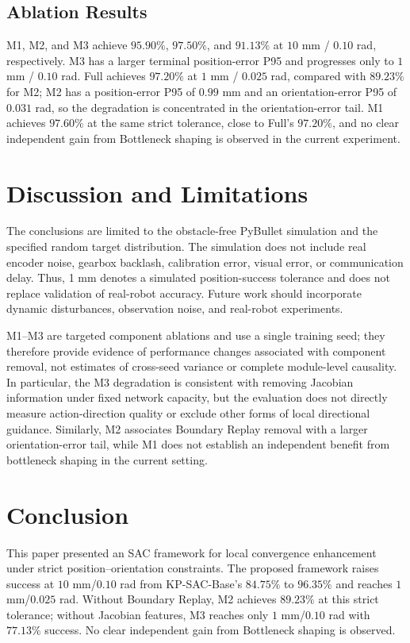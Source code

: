 \documentclass[conference]{IEEEtran}
\begin{document}
\subsection{Ablation Results}
M1, M2, and M3 achieve $95.90\%$, $97.50\%$, and $91.13\%$ at $10$ mm / $0.10$ rad, respectively. M3 has a larger terminal position-error P95 and progresses only to $1$ mm / $0.10$ rad. Full achieves $97.20\%$ at $1$ mm / $0.025$ rad, compared with $89.23\%$ for M2; M2 has a position-error P95 of $0.99$ mm and an orientation-error P95 of $0.031$ rad, so the degradation is concentrated in the orientation-error tail. M1 achieves $97.60\%$ at the same strict tolerance, close to Full's $97.20\%$, and no clear independent gain from Bottleneck shaping is observed in the current experiment.

\section{Discussion and Limitations}
The conclusions are limited to the obstacle-free PyBullet simulation and the specified random target distribution. The simulation does not include real encoder noise, gearbox backlash, calibration error, visual error, or communication delay. Thus, 1 mm denotes a simulated position-success tolerance and does not replace validation of real-robot accuracy. Future work should incorporate dynamic disturbances, observation noise, and real-robot experiments.

M1--M3 are targeted component ablations and use a single training seed; they therefore provide evidence of performance changes associated with component removal, not estimates of cross-seed variance or complete module-level causality. In particular, the M3 degradation is consistent with removing Jacobian information under fixed network capacity, but the evaluation does not directly measure action-direction quality or exclude other forms of local directional guidance. Similarly, M2 associates Boundary Replay removal with a larger orientation-error tail, while M1 does not establish an independent benefit from bottleneck shaping in the current setting.

\section{Conclusion}
This paper presented an SAC framework for local convergence enhancement under strict position--orientation constraints. The proposed framework raises success at $10$ mm/$0.10$ rad from KP-SAC-Base's $84.75\%$ to $96.35\%$ and reaches $1$ mm/$0.025$ rad. Without Boundary Replay, M2 achieves $89.23\%$ at this strict tolerance; without Jacobian features, M3 reaches only $1$ mm/$0.10$ rad with $77.13\%$ success. No clear independent gain from Bottleneck shaping is observed.
\end{document}
